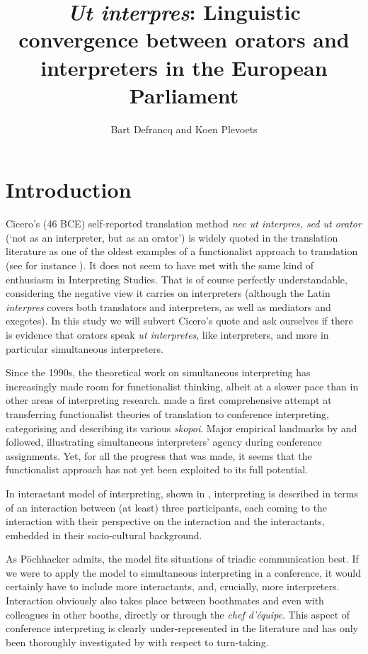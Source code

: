 \documentclass[output=paper]{langscibook}
\author{Bart Defrancq\orcid{}\affiliation{EQTIS, Ghent University} and Koen Plevoets\orcid{}\affiliation{EQTIS, Ghent University}}
\title[Ut interpres]{\textit{Ut interpres}: Linguistic convergence between orators and interpreters in the European Parliament}
\begin{document}
\maketitle




\section{Introduction}

Cicero’s (46 BCE) self-reported translation method \textit{nec ut interpres, sed ut orator} (‘not as an interpreter, but as an orator’) is widely quoted in the translation literature as one of the oldest examples of a functionalist approach to translation (see for instance \citealt{Nord2013}). It does not seem to have met with the same kind of enthusiasm in Interpreting Studies. That is of course perfectly understandable, considering the negative view it carries on interpreters (although the Latin \textit{interpres} covers both translators and interpreters, as well as mediators and exegetes). In this study we will subvert Cicero’s quote and ask ourselves if there is evidence that orators speak \textit{ut interpretes}, like interpreters, and more in particular simultaneous interpreters.

Since the 1990s, the theoretical work on simultaneous interpreting has increasingly made room for functionalist thinking, albeit at a slower pace than in other areas of interpreting research. \citet{Poechhacker1994} made a first comprehensive attempt at transferring functionalist theories of translation to conference interpreting, categorising and describing its various \textit{skopoi}. Major empirical landmarks by \citet{Diriker2004} and \citet{Monacelli2009} followed, illustrating simultaneous interpreters’ agency during conference assignments. Yet, for all the progress that was made, it seems that the functionalist approach has not yet been exploited to its full potential. 

In  interactant model of interpreting, shown in , interpreting is described in terms of an interaction between (at least) three participants, each coming to the interaction with their perspective on the interaction and the interactants, embedded in their socio-cultural background.

As Pöchhacker admits, the model fits situations of triadic communication best. If we were to apply the model to simultaneous interpreting in a conference, it would certainly have to include more interactants, and, crucially, more interpreters. Interaction obviously also takes place between boothmates and even with colleagues in other booths, directly or through the \textit{chef d’équipe}. This aspect of conference interpreting is clearly under-represented in the literature and has only been thoroughly investigated by \citet{Duflou2016} with respect to turn-taking.   
\end{document}
